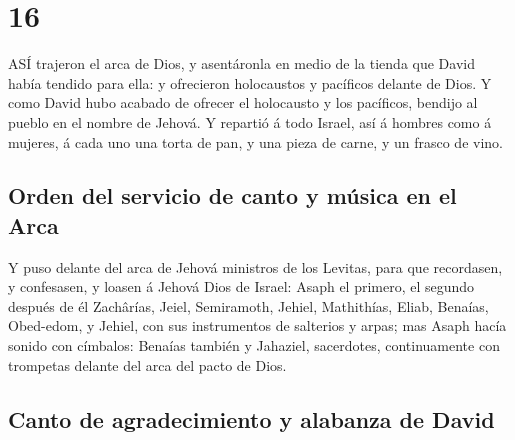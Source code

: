 \hypertarget{section-15}{%
\section{16}\label{section-15}}

 ASÍ trajeron el arca de Dios, y asentáronla en medio de la
tienda que David había tendido para ella: y ofrecieron holocaustos y
pacíficos delante de Dios.  Y como David hubo acabado de
ofrecer el holocausto y los pacíficos, bendijo al pueblo en el nombre de
Jehová.  Y repartió á todo Israel, así á hombres como á
mujeres, á cada uno una torta de pan, y una pieza de carne, y un frasco
de vino.

\hypertarget{orden-del-servicio-de-canto-y-muxfasica-en-el-arca}{%
\subsection{Orden del servicio de canto y música en el
Arca}\label{orden-del-servicio-de-canto-y-muxfasica-en-el-arca}}

 Y puso delante del arca de Jehová ministros de los Levitas,
para que recordasen, y confesasen, y loasen á Jehová Dios de Israel:
 Asaph el primero, el segundo después de él Zachârías,
Jeiel, Semiramoth, Jehiel, Mathithías, Eliab, Benaías, Obed-edom, y
Jehiel, con sus instrumentos de salterios y arpas; mas Asaph hacía
sonido con címbalos:  Benaías también y Jahaziel,
sacerdotes, continuamente con trompetas delante del arca del pacto de
Dios.

\hypertarget{canto-de-agradecimiento-y-alabanza-de-david}{%
\subsection{Canto de agradecimiento y alabanza de
David}\label{canto-de-agradecimiento-y-alabanza-de-david}}

